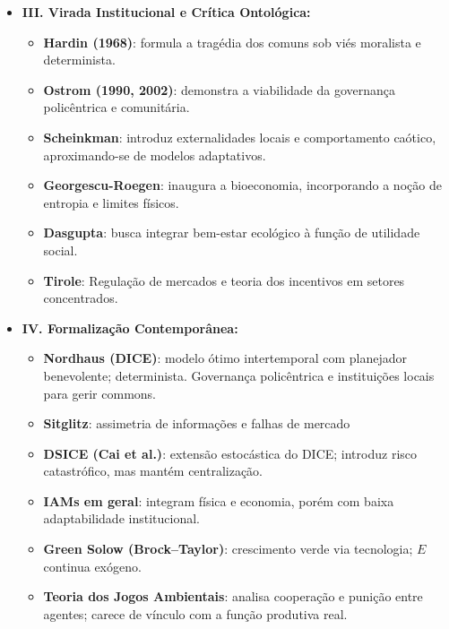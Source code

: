 \documentclass[a4paper,12pt,oneside,brazil,english]{abntex2}
\begin{document}
\begin{itemize}
        \item \textbf{III. Virada Institucional e Crítica Ontológica:}
        \begin{itemize}
            \item \textbf{Hardin (1968)}: formula a tragédia dos comuns sob viés moralista e determinista.
            \item \textbf{Ostrom (1990, 2002)}: demonstra a viabilidade da governança policêntrica e comunitária.
            \item \textbf{Scheinkman}: introduz externalidades locais e comportamento caótico, aproximando-se de modelos adaptativos.
            \item \textbf{Georgescu-Roegen}: inaugura a bioeconomia, incorporando a noção de entropia e limites físicos.
            \item \textbf{Dasgupta}: busca integrar bem-estar ecológico à função de utilidade social.
            \item \textbf{Tirole}: Regulação de mercados e teoria dos incentivos em setores concentrados.
        \end{itemize}

        \item \textbf{IV. Formalização Contemporânea:}
        \begin{itemize}
            \item \textbf{Nordhaus (DICE)}: modelo ótimo intertemporal com planejador benevolente; determinista. Governança policêntrica e instituições locais para gerir commons.
            \item \textbf{Sitglitz}: assimetria de informações e falhas de mercado
            \item \textbf{DSICE (Cai et al.)}: extensão estocástica do DICE; introduz risco catastrófico, mas mantém centralização.
            \item \textbf{IAMs em geral}: integram física e economia, porém com baixa adaptabilidade institucional.
            \item \textbf{Green Solow (Brock–Taylor)}: crescimento verde via tecnologia; $E$ continua exógeno.
            \item \textbf{Teoria dos Jogos Ambientais}: analisa cooperação e punição entre agentes; carece de vínculo com a função produtiva real.
        \end{itemize}
    \end{itemize}
\end{document}
